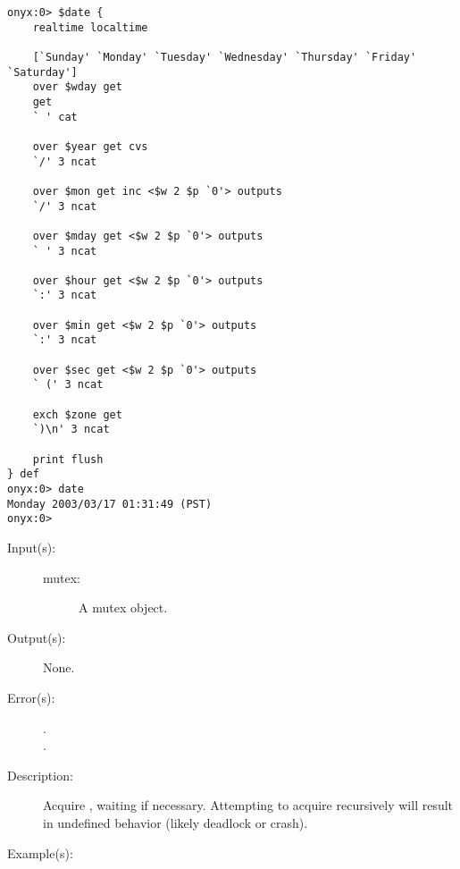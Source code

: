 \begin{description}
\begin{description}
\begin{verbatim}
onyx:0> $date {
    realtime localtime

    [`Sunday' `Monday' `Tuesday' `Wednesday' `Thursday' `Friday' `Saturday']
    over $wday get
    get
    ` ' cat

    over $year get cvs
    `/' 3 ncat

    over $mon get inc <$w 2 $p `0'> outputs
    `/' 3 ncat

    over $mday get <$w 2 $p `0'> outputs
    ` ' 3 ncat

    over $hour get <$w 2 $p `0'> outputs
    `:' 3 ncat

    over $min get <$w 2 $p `0'> outputs
    `:' 3 ncat

    over $sec get <$w 2 $p `0'> outputs
    ` (' 3 ncat

    exch $zone get
    `)\n' 3 ncat

    print flush
} def
onyx:0> date
Monday 2003/03/17 01:31:49 (PST)
onyx:0>
		\end{verbatim}
	\end{description}
\label{systemdict:lock}
\item[{\onyxop{mutex}{lock}{--}}: ]
	\begin{description}\item[]
	\item[Input(s): ]
		\begin{description}\item[]
		\item[mutex: ]
			A mutex object.
		\end{description}
	\item[Output(s): ] None.
	\item[Error(s): ]
		\begin{description}\item[]
		\item[.]
		\item[.]
		\end{description}
	\item[Description: ]
		Acquire , waiting if necessary.  Attempting to
		acquire  recursively will result in undefined
		behavior (likely deadlock or crash).
	\item[Example(s): ]\begin{verbatim}


\end{verbatim}
\end{description}
\end{description}
